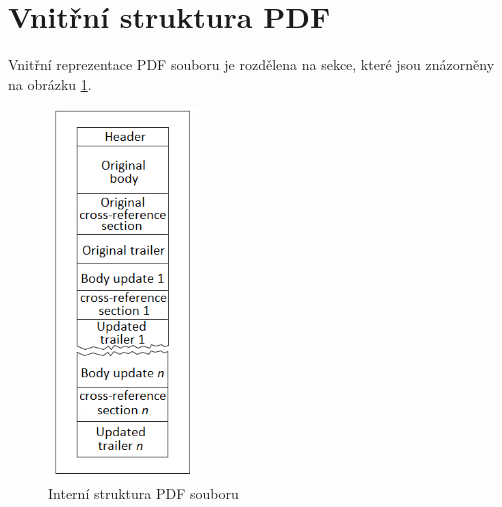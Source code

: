 \section{Vnitřní struktura PDF}
Vnitřní reprezentace PDF souboru je rozdělena na sekce, které jsou znázorněny na obrázku \ref{fig:pdf_internal_structure}.

\begin{figure}[h!]
\centering
\includegraphics[width=4cm]{img/pdf_internal_structure}
\caption{Interní struktura PDF souboru}
\label{fig:pdf_internal_structure}
\end{figure}

